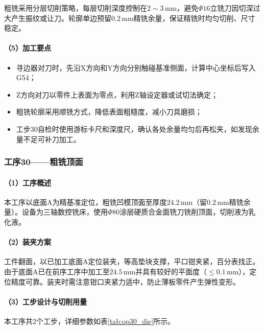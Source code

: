 \documentclass{xautCADreport}
\begin{document}
粗铣采用分层切削策略，每层切削深度控制在$2\sim3\,\mathrm{mm}$，避免$\Phi16$立铣刀因切深过大产生振纹或让刀。轮廓单边预留$0.2\,\mathrm{mm}$精铣余量，保证精铣时均匀切削、尺寸稳定。

\paragraph{（5）加工要点}

\begin{itemize}
  \item 寻边器对刀时，先沿X方向和Y方向分别触碰基准侧面，计算中心坐标后写入G54；
  \item Z方向对刀以零件上表面为零点，利用Z轴设定器或试切法确定；
  \item 粗铣轮廓采用顺铣方式，降低表面粗糙度，减小刀具磨损；
  \item 工步30自检时使用游标卡尺和深度尺，确认各处余量均匀后再松夹，如发现余量不足可补刀加工。
\end{itemize}

\subsubsection{工序30——粗铣顶面}

\paragraph{（1）工序概述}

本工序以底面A为精基准定位，粗铣凹模顶面至厚度$24.2\,\mathrm{mm}$（留$0.2\,\mathrm{mm}$精铣余量）。设备为三轴数控铣床，使用$\Phi80$涂层硬质合金面铣刀铣削顶面，切削液为乳化液。

\paragraph{（2）装夹方案}

工件翻面，以已加工底面A定位装夹，等高垫块支撑，平口钳夹紧，百分表找正。由于底面A已在前序工序中加工至$24.5\,\mathrm{mm}$并具有较好的平面度（$\leq0.1\,\mathrm{mm}$），定位精度可靠。装夹时需注意钳口夹紧力适中，防止薄板零件产生弹性变形。

\paragraph{（3）工步设计与切削用量}

本工序共2个工步，详细参数如表\ref{tab:op30_die}所示。
\end{document}
